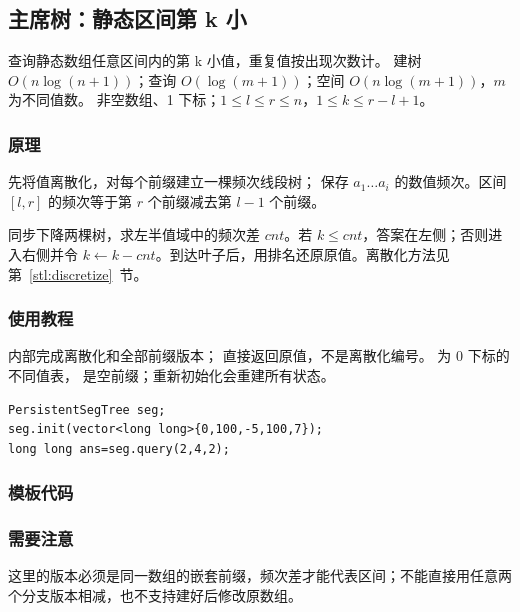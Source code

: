 \subsection{主席树：静态区间第 k 小}
\label{ds:persistent-kth}
\AlgorithmInfo
    {查询静态数组任意区间内的第 k 小值，重复值按出现次数计。}
    {建树 $O(n\log(n+1))$；查询 $O(\log(m+1))$；空间 $O(n\log(m+1))$，$m$ 为不同值数。}
    {非空数组、1 下标；$1\le l\le r\le n$，$1\le k\le r-l+1$。}
\subsubsection*{原理}
先将值离散化，对每个前缀建立一棵频次线段树； 保存 $a_1\ldots a_i$ 的数值频次。区间 $[l,r]$ 的频次等于第 $r$ 个前缀减去第 $l-1$ 个前缀。

同步下降两棵树，求左半值域中的频次差 $cnt$。若 $k\le cnt$，答案在左侧；否则进入右侧并令 $k\gets k-cnt$。到达叶子后，用排名还原原值。离散化方法见第~\ref{stl:discretize}~节。

\subsubsection*{使用教程}
 内部完成离散化和全部前缀版本； 直接返回原值，不是离散化编号。 为 0 下标的不同值表， 是空前缀；重新初始化会重建所有状态。
\begin{lstlisting}[style=mtycpp,numbers=none]
PersistentSegTree seg;
seg.init(vector<long long>{0,100,-5,100,7});
long long ans=seg.query(2,4,2);
\end{lstlisting}
\subsubsection*{模板代码}
\subsubsection*{需要注意}
这里的版本必须是同一数组的嵌套前缀，频次差才能代表区间；不能直接用任意两个分支版本相减，也不支持建好后修改原数组。
